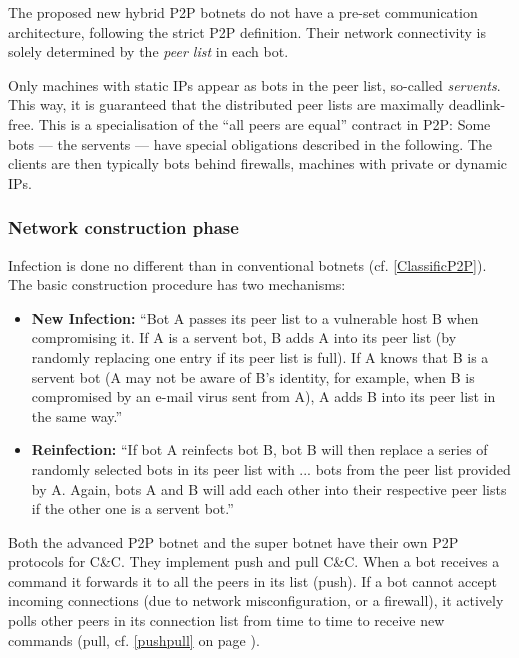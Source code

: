 \documentclass{llncs}
\begin{document}
The proposed new hybrid P2P botnets do not have a pre-set
communication architecture, following the strict P2P definition. Their
network connectivity is solely determined by the {\it peer list} in
each bot.

Only machines with static IPs appear as bots in the peer list,
so-called {\it servents}.\cite{td1sc} This way, it is guaranteed that
the distributed peer lists are maximally deadlink-free.  This is a
specialisation of the ``all peers are equal'' contract in P2P: Some
bots --- the servents --- have special obligations described in the
following.  The clients are then typically bots behind firewalls,
machines with private or dynamic IPs.

\subsubsection{Network construction phase}

Infection is done no different than in conventional botnets
(cf. \ref{ClassificP2P}). The basic construction procedure has two
mechanisms:
\begin{itemize}
\item {\bf New Infection:} ``Bot A passes its peer list to a
vulnerable host B when compromising it. If A is a
servent bot, B adds A into its peer list (by randomly
replacing one entry if its peer list is full). If A knows
that B is a servent bot (A may not be aware of
B’s identity, for example, when B is compromised by
an e-mail virus sent from A), A adds B into its peer
list in the same way.'' \cite{td1sc}
\item {\bf Reinfection:} ``If bot A
reinfects bot B, bot B will then replace \lbrack{}a series of\rbrack{} 
 randomly selected bots in its peer list with \lbrack{}...\rbrack{} bots
from the peer list provided by A. Again, bots A and B
will add each other into their respective peer lists if
the other one is a servent bot.''\cite{td1sc}
\end{itemize}

Both the advanced P2P botnet and the super botnet have their own P2P
protocols for C\&C. They implement push and pull
C\&C.\cite{wang2009systematic} When a bot receives a command it
forwards it to all the peers in its list (push). If a bot cannot
accept incoming connections (due to network misconfiguration, or a
firewall), it actively polls other peers in its connection list from
time to time to receive new commands (pull, cf. \ref{pushpull} on page
\pageref{pushpull}).
\end{document}
